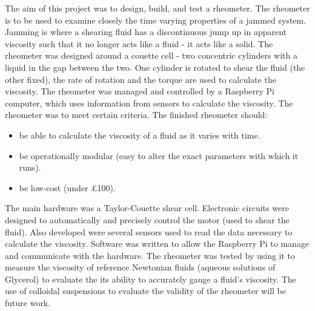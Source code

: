 \documentclass[twoside,a4]{report}
\def\br{\newline \newline \noindent}
\begin{document}
	The aim of this project was to design, build, and test a rheometer. The rheometer is to be used to examine closely the time varying properties of a jammed system. Jamming is where a shearing fluid has a discontinuous jump up in apparent viscosity such that it no longer acts like a fluid - it acts like a solid. The rheometer was designed around a couette cell - two concentric cylinders with a liquid in the gap between the two. One cylinder is rotated to shear the fluid (the other fixed), the rate of rotation and the torque are used to calculate the viscosity. The rheometer was managed and controlled by a Raspberry Pi computer, which uses information from sensors to calculate the viscosity. The rheometer was to meet certain criteria. The finished rheometer should:
	\begin{itemize}
		\item be able to calculate the viscosity of a fluid as it varies with time.
		\item be operationally modular (easy to alter the exact parameters with which it runs).
		\item be low-cost (under \pounds 100).
	\end{itemize}
	The main hardware was a Taylor-Couette shear cell. Electronic circuits were designed to automatically and precisely control the motor (used to shear the fluid). Also developed were several sensors used to read the data necessary to calculate the viscosity. Software was written to allow the Raspberry Pi to manage and communicate with the hardware. 
	\br
	The rheometer was tested by using it to measure the viscosity of reference Newtonian fluids (aqueous solutions of Glycerol) to evaluate the its ability to accurately gauge a fluid's viscosity.  The use of colloidal suspensions to evaluate the validity of the rheometer will be future work.
	
	
	\newpage \begin{center} \large \space \normalsize \end{center}
	
\end{document}
